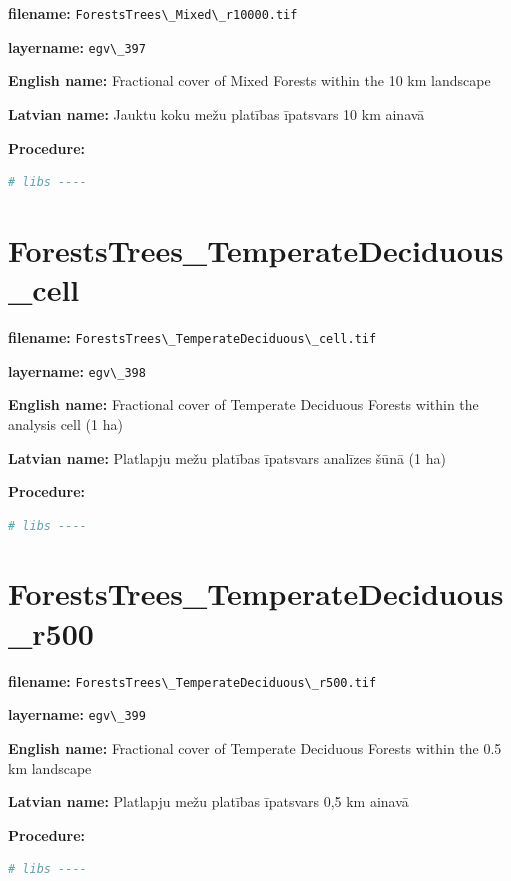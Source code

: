 \documentclass[
]{book}
\newcommand{\passthrough}[1]{#1}
\begin{document}
\textbf{filename:} \passthrough{\lstinline!ForestsTrees\_Mixed\_r10000.tif!}

\textbf{layername:} \passthrough{\lstinline!egv\_397!}

\textbf{English name:} Fractional cover of Mixed Forests within the 10 km landscape

\textbf{Latvian name:} Jauktu koku mežu platības īpatsvars 10 km ainavā

\textbf{Procedure:}

\begin{lstlisting}[language=R]
# libs ----
\end{lstlisting}

\section{ForestsTrees\_TemperateDeciduous\_cell}\label{ch06.398}

\textbf{filename:} \passthrough{\lstinline!ForestsTrees\_TemperateDeciduous\_cell.tif!}

\textbf{layername:} \passthrough{\lstinline!egv\_398!}

\textbf{English name:} Fractional cover of Temperate Deciduous Forests within the analysis cell (1 ha)

\textbf{Latvian name:} Platlapju mežu platības īpatsvars analīzes šūnā (1 ha)

\textbf{Procedure:}

\begin{lstlisting}[language=R]
# libs ----
\end{lstlisting}

\section{ForestsTrees\_TemperateDeciduous\_r500}\label{ch06.399}

\textbf{filename:} \passthrough{\lstinline!ForestsTrees\_TemperateDeciduous\_r500.tif!}

\textbf{layername:} \passthrough{\lstinline!egv\_399!}

\textbf{English name:} Fractional cover of Temperate Deciduous Forests within the 0.5 km landscape

\textbf{Latvian name:} Platlapju mežu platības īpatsvars 0,5 km ainavā

\textbf{Procedure:}

\begin{lstlisting}[language=R]
# libs ----
\end{lstlisting}
\end{document}

